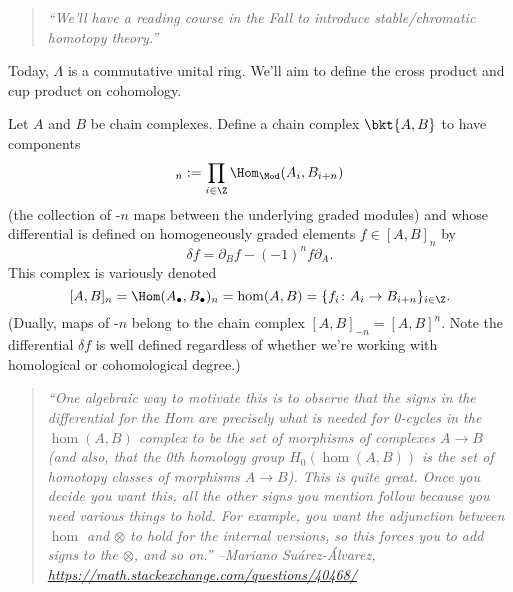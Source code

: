 \begin{quote}
\textit{%
    ``We'll have a reading course in the Fall to introduce stable/chromatic homotopy theory.''
}
\end{quote}

Today, $\Lambda$ is a commutative unital ring. We'll aim to define the cross product and cup product on cohomology.

\begin{defn}
    \label{defn:internal_hom}
    Let $A$ and $B$ be chain complexes.
    Define a chain complex $\bkt{A,B}$ to have components
    \begin{equation*}
        [A,B]_n := \prod_{i \in \Z} \Hom_{\Mod}(A_i, B_{i+n})
    \end{equation*}
    (the collection of -$n$ maps between the underlying graded modules) 
    and whose differential is defined on homogeneously graded elements 
    $f \in [A,B]_n$ by
    \[\delta f = \partial_B f - (-1)^{n} f \partial_A.\]
    This complex is variously denoted 
    \[[A,B]_n = \Hom(A_\bullet, B_\bullet)_n  = \mathrm{hom}(A, B) = \{f_i \colon A_i \to B_{i+n}\}_{i \in \Z}.\]
    (Dually, maps of -$n$ belong to the chain complex $[A, B]_{-n} = [A, B]^{n}$.
    Note the differential $\delta f$ is well defined regardless of whether we're working with homological or cohomological degree.)
\end{defn}

\begin{quote}
\textit{%
    ``One algebraic way to motivate this is to observe that the signs in the differential for the Hom are precisely what is needed for 0-cycles in the $\hom(A,B)$ complex to be the set of morphisms of complexes $A\to B$ (and also, that the 0th homology group $H_0(\hom(A,B))$ is the set of homotopy classes of morphisms $A\to B$). This is quite great. Once you decide you want this, all the other signs you mention follow because you need various things to hold. For example, you want the adjunction between $\hom$ and $\otimes$ to hold for the internal versions, so this forces you to add signs to the $\otimes$, and so on.'' --Mariano Suárez-Álvarez, \url{https://math.stackexchange.com/questions/40468/}
}
\end{quote}

